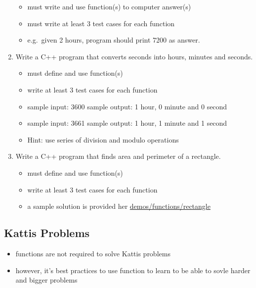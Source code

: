 \documentclass[11pt]{article}
\providecommand{\tightlist}{%
      \setlength{\itemsep}{0pt}\setlength{\parskip}{0pt}}
\begin{document}
\begin{enumerate}
  \begin{itemize}
  \tightlist
  \item
    must write and use function(s) to computer answer(s)
  \item
    must write at least 3 test cases for each function
  \item
    e.g.~given 2 hours, program should print 7200 as answer.
  \end{itemize}
\item
  Write a C++ program that converts seconds into hours, minutes and
  seconds.

  \begin{itemize}
  \tightlist
  \item
    must define and use function(s)
  \item
    write at least 3 test cases for each function
  \item
    sample input: 3600 sample output: 1 hour, 0 minute and 0 second
  \item
    sample input: 3661 sample output: 1 hour, 1 minute and 1 second
  \item
    Hint: use series of division and modulo operations
  \end{itemize}
\item
  Write a C++ program that finds area and perimeter of a rectangle.

  \begin{itemize}
  \tightlist
  \item
    must define and use function(s)
  \item
    write at least 3 test cases for each function
  \item
    a sample solution is provided her \url{demos/functions/rectangle}
  \end{itemize}
\end{enumerate}

\hypertarget{kattis-problems}{%
\subsection{Kattis Problems}\label{kattis-problems}}

\begin{itemize}
\tightlist
\item
  functions are not required to solve Kattis problems
\item
  however, it's best practices to use function to learn to be able to
  sovle harder and bigger problems
\end{itemize}
\end{document}
